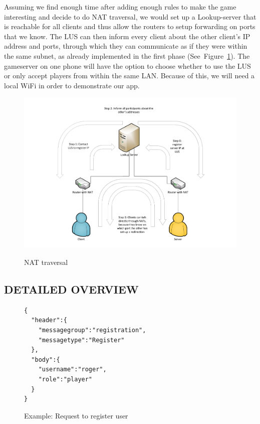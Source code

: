 \documentclass{report}
\newcommand{\lfig}[1]{\label{fig:#1}}
\newcommand{\rfig}[1]{Figure~\ref{fig:#1}}
\begin{document}
Assuming we find enough time after adding enough rules to make the game interesting and decide to do NAT traversal, we would set up a Lookup-server that is reachable for all clients and thus allow the routers to setup forwarding on ports that we know. The LUS can then inform every client about the other client's IP address and ports, through which they can communicate as if they were within the same subnet, as already implemented in the first phase (See~\rfig{nat}). The gameserver on one phone will have the option to choose whether to use the LUS or only accept players from within the same LAN.
Because of this, we will need a local WiFi in order to demonstrate our app.\\
\begin{figure}[h]
	\centering
    \includegraphics[width=\columnwidth]{NATholepunching.pdf}
    \lfig{nat}
    \vspace{-5mm} %
	\caption{NAT traversal}
\end{figure}
\subsection{DETAILED OVERVIEW}
\begin{figure}
\begin{verbatim}
{
  "header":{
    "messagegroup":"registration",
    "messagetype":"Register"
  },
  "body":{
    "username":"roger",
    "role":"player"
  }
}
\end{verbatim}
\caption{Example: Request to register user}
\lfig{regmsg}
\end{figure}
\end{document}

